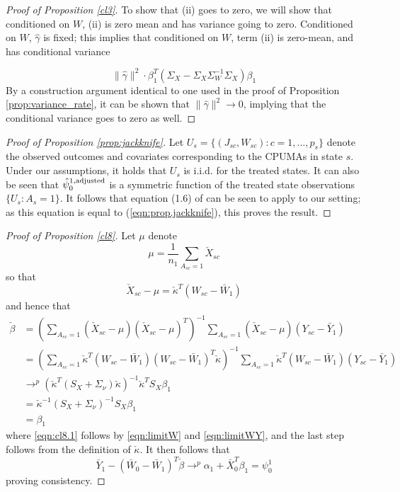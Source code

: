\documentclass[aoas]{imsart}
\theoremstyle{plain}
\theoremstyle{remark}
\begin{document}
\begin{appendix}
\begin{proof}[Proof of Proposition \ref{cl3}]
To show that (ii) goes to zero, we will show that conditioned on $W$, (ii) is zero mean and has variance going to zero. Conditioned on $W$, $\hat{\gamma}$ is fixed; this implies that conditioned on $W$, term (ii) is zero-mean, and has conditional variance 

\[ \|\hat{\gamma}\|^2 \cdot \beta_1^T(\Sigma_X - \Sigma_X\Sigma_W^{-1}\Sigma_X) \beta_1\]
By a construction argument identical to one used in the proof of Proposition \ref{prop:variance_rate}, it can be shown that $\|\hat{\gamma}\|^2\rightarrow 0$, implying that the conditional variance goes to zero as well.
\end{proof}

\begin{proof}[Proof of Proposition \ref{prop:jackknife}]
Let $U_s = \{(J_{sc}, W_{sc}): c = 1,\ldots,p_s\}$ denote the observed outcomes and covariates corresponding to the CPUMAs in state $s$. Under our assumptions, it holds that $U_s$ is i.i.d. for the treated states. It can also be seen that $\hat{\psi}_0^{1,\textup{adjusted}}$ is a symmetric function of the treated state observations $\{U_s: A_s=1\}$. It follows that equation (1.6) of  \cite{efron1981jackknife} can be seen to apply to our setting; as this equation is equal to (\ref{eqn:prop.jackknife}), this proves the result.
\end{proof}

\begin{proof}[Proof of Proposition \ref{cl8}]
Let $\mu$ denote 
\[ \mu = \frac{1}{n_1} \sum_{A_{sc} = 1} \check{X}_{sc}\]
so that
\[ \check{X}_{sc} - \mu = \check{\kappa}^T(W_{sc} - \bar{W}_1)\]
and hence that 
\begin{align}
 \nonumber \check{\beta} &=  \left(\sum_{A_{sc}=1} (\check{X}_{sc} - \mu)(\check{X}_{sc} - \mu)^T\right)^{-1} \sum_{A_{sc}=1} (\check{X}_{sc} - \mu)(Y_{sc} - \bar{Y}_1) \\
 \nonumber & = \left(\sum_{A_{sc}=1} \check{\kappa}^T (W_{sc} - \bar{W}_1)(W_{sc} - \bar{W}_1)^T \check{\kappa}\right)^{-1} \sum_{A_{sc}=1} \check{\kappa}^T(W_{sc} - \bar{W}_1)(Y_{sc} - \bar{Y}_1) \\
 & \to^p (\check{\kappa}^T (S_X + \Sigma_\nu) \check{\kappa})^{-1} \check{\kappa}^T S_X \beta_1  \label{eqn:cl8.1}\\
 \nonumber 
 & = \check{\kappa}^{-1} (S_X + \Sigma_{\nu})^{-1} S_X \beta_1 \\
 \nonumber 
 & = \beta_1
 \end{align}
 where \eqref{eqn:cl8.1} follows by \eqref{eqn:limitW} and \eqref{eqn:limitWY}, and the last step follows from the definition of $\check{\kappa}$. It then follows that 
 \[ \bar{Y}_1 - (\bar{W}_0 - \bar{W}_1)^T \check{\beta} \to^p \alpha_1 + \bar{X}_0^T \beta_1 = \psi_0^1\]
 proving consistency.
\end{proof}


\end{appendix}
\end{document}
